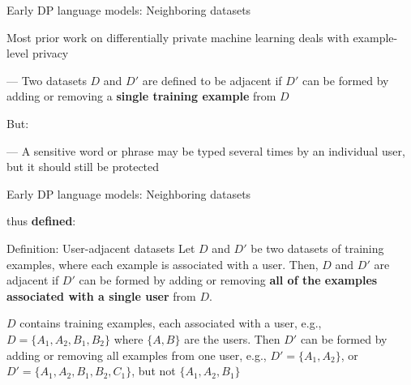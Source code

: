 \documentclass[12pt,aspectratio=169,handout]{beamer}
\begin{document}
\begin{frame}{Early DP language models: Neighboring datasets}

Most prior work on differentially private machine learning deals with example-level privacy

--- Two datasets $D$ and $D'$ are defined to be adjacent if $D'$ can be formed by adding or removing a \textbf{single training example} from $D$

But:

--- A sensitive word or phrase may be typed several times by an individual user, but it should still be protected


\end{frame}

\begin{frame}{Early DP language models: Neighboring datasets}

\citet{McMahan.et.al.2018.ICLR} thus \textbf{defined}:

\begin{block}{Definition: User-adjacent datasets}
\small
Let $D$ and $D'$ be two datasets of training examples, where each example is associated with a user. Then, $D$ and $D'$ are adjacent if $D'$ can be formed by adding or removing \textbf{all of the examples associated with a single user} from $D$.
\end{block}

$D$ contains training examples, each associated with a user, e.g., $D = \{A_1, A_2, B_1, B_2\}$ where $\{A, B\}$ are the users. Then $D'$ can be formed by adding or removing all examples from one user, e.g., $D' = \{A_1, A_2\}$, or $D' = \{A_1, A_2, B_1, B_2, C_1\}$, but not $\{A_1, A_2, B_1\}$



\end{frame}
\end{document}
